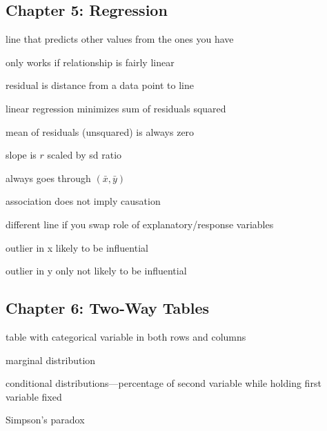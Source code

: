 \documentclass[landscape]{exam}
\begin{document}
  \subsection{Chapter 5: Regression}

  \begin{itemize*}
    \item line that predicts other values from the ones you have
    \item only works if relationship is fairly linear
    \item residual is distance from a data point to line
    \item linear regression minimizes sum of residuals squared
    \item mean of residuals (unsquared) is always zero
    \item slope is $r$ scaled by sd ratio
    \item always goes through $(\bar{x}, \bar{y})$
    \item association does not imply causation
    \item different line if you swap role of explanatory/response variables
    \item outlier in x likely to be influential
    \item outlier in y only not likely to be influential
  \end{itemize*}

  \subsection{Chapter 6: Two-Way Tables}
  \begin{itemize*}
    \item table with categorical variable in both rows and columns
    \item marginal distribution
    \item conditional distributions---percentage of second variable while
      holding first variable fixed
    \item Simpson's paradox
  \end{itemize*}
\end{document}
